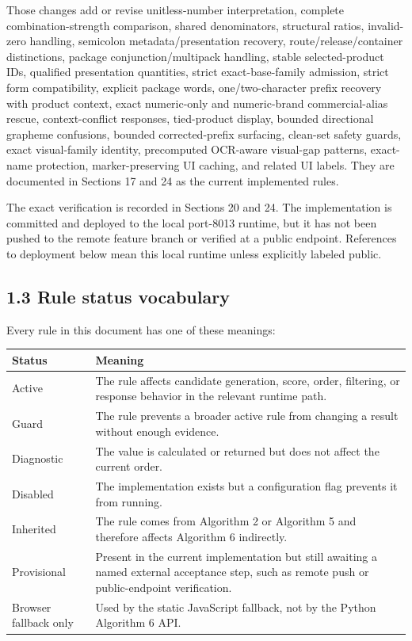 Those changes add or revise unitless-number interpretation, complete combination-strength comparison, shared denominators, structural ratios, invalid-zero handling, semicolon metadata/presentation recovery, route/release/container distinctions, package conjunction/multipack handling, stable selected-product IDs, qualified presentation quantities, strict exact-base-family admission, strict form compatibility, explicit package words, one/two-character prefix recovery with product context, exact numeric-only and numeric-brand commercial-alias rescue, context-conflict responses, tied-product display, bounded directional grapheme confusions, bounded corrected-prefix surfacing, clean-set safety guards, exact visual-family identity, precomputed OCR-aware visual-gap patterns, exact-name protection, marker-preserving UI caching, and related UI labels. They are documented in Sections 17 and 24 as the current implemented rules.

The exact verification is recorded in Sections 20 and 24. The implementation is committed and deployed to the local port-8013 runtime, but it has not been pushed to the remote feature branch or verified at a public endpoint. References to deployment below mean this local runtime unless explicitly labeled public.

\subsection{1.3 Rule status vocabulary}\label{13-rule-status-vocabulary}

Every rule in this document has one of these meanings:

{\def\LTcaptype{none} %
\begin{longtable}[]{@{}>{\RaggedRight\arraybackslash}p{.27\linewidth}>{\RaggedRight\arraybackslash}p{.66\linewidth}@{}}
\toprule\noalign{}
Status & Meaning \\
\midrule\noalign{}
\endhead
\bottomrule\noalign{}
\endlastfoot
Active & The rule affects candidate generation, score, order, filtering, or response behavior in the relevant runtime path. \\
Guard & The rule prevents a broader active rule from changing a result without enough evidence. \\
Diagnostic & The value is calculated or returned but does not affect the current order. \\
Disabled & The implementation exists but a configuration flag prevents it from running. \\
Inherited & The rule comes from Algorithm 2 or Algorithm 5 and therefore affects Algorithm 6 indirectly. \\
Provisional & Present in the current implementation but still awaiting a named external acceptance step, such as remote push or public-endpoint verification. \\
Browser fallback only & Used by the static JavaScript fallback, not by the Python Algorithm 6 API. \\
\end{longtable}
}

